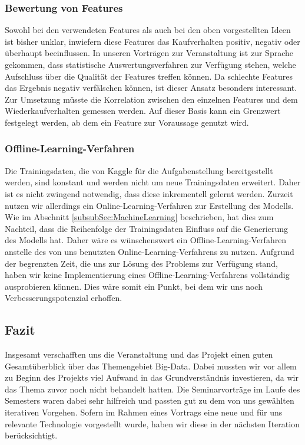\subsubsection{Bewertung von Features}	
Sowohl bei den verwendeten Features als auch bei den oben vorgestellten Ideen ist bisher unklar, inwiefern diese Features das Kaufverhalten positiv, negativ oder überhaupt beeinflussen.
In unseren Vorträgen zur Veranstaltung ist zur Sprache gekommen, dass statistische Auswertungsverfahren zur Verfügung stehen, welche Aufschluss über die Qualität der Features treffen können. Da schlechte Features das Ergebnis negativ verfälschen können, ist dieser Ansatz besonders interessant.
Zur Umsetzung müsste die Korrelation zwischen den einzelnen Features und dem Wiederkaufverhalten gemessen werden. Auf dieser Basis kann ein Grenzwert festgelegt werden, ab dem ein Feature
zur Voraussage genutzt wird.

\subsubsection{Offline-Learning-Verfahren}	
Die Trainingsdaten, die von Kaggle für die Aufgabenstellung bereitgestellt werden, sind konstant und werden 
nicht um neue Trainingsdaten erweitert.
Daher ist es nicht zwingend notwendig, dass diese inkrementell gelernt werden.
Zurzeit nutzen wir allerdings ein Online-Learning-Verfahren zur Erstellung des Modells.
Wie im Abschnitt \ref{subsubSec:MachineLearning} beschrieben, hat dies zum Nachteil,
dass die Reihenfolge der Trainingsdaten Einfluss auf die Generierung des Modells hat. 
Daher wäre es wünschenswert ein Offline-Learning-Verfahren anstelle des von uns benutzten Online-Learning-Verfahrens zu nutzen.
Aufgrund der begrenzten Zeit, die uns zur Lösung des Problems zur Verfügung stand, haben wir keine Implementierung eines Offline-Learning-Verfahrens vollständig ausprobieren können.
Dies wäre somit ein Punkt, bei dem wir uns noch Verbesserungspotenzial erhoffen.

\subsection{Fazit}
Insgesamt verschafften uns die Veranstaltung und das Projekt einen guten Gesamtüberblick über das Themengebiet Big-Data.
Dabei mussten wir vor allem zu Beginn des Projekts viel Aufwand in das Grundverständnis investieren, da wir das Thema zuvor noch nicht behandelt hatten. Die Seminarvorträge im Laufe des Semesters waren dabei sehr hilfreich und passten gut zu dem von uns gewählten iterativen Vorgehen. Sofern im Rahmen eines Vortrags eine neue und für uns relevante Technologie vorgestellt wurde, haben wir diese in der nächsten Iteration berücksichtigt.  


